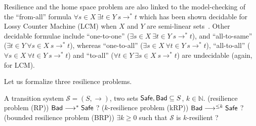 Resilience and the home space problem are also linked to the 
model-checking of the ``from-all'' formula $\forall s \in X~ \exists t \in Y~ s \to^* t$
which has been shown decidable for Lossy Counter Machine (LCM)
when $X$ and $Y$ are semi-linear sets~\cite{DBLP:conf/rp/Schnoebelen10}.
Other decidable formulae include ``one-to-one'' ($\exists s \in  X ~ \exists t \in  Y ~ s \to^* 
 t$), and ``all-to-same'' ($\exists t \in  Y ~ \forall s \in  X ~ s \to^*  t$),
whereas ``one-to-all'' ($\exists s \in  X ~ \forall t \in  Y ~ s \to^*  t$), 
``all-to-all'' ($\forall s \in  X ~ \forall t \in  Y ~ s \to^*  t$)
  and ``to-all'' ($\forall t \in  Y  ~ \exists s \in  X ~ s \to^*  t$) are undecidable (again, for LCM). 
  


Let us formalize three resilience problems.

\iffalse
\problemx{resilience problem (RP)}
{A transition system $\mathscr{S}=(S,\rightarrow)$ and two sets $\Safe, \Bad \subseteq S$.}
{$\Bad \longrightarrow^{*} \Safe$ ?\newline}

\alain{il faudrait ne pas répéter 3 fois les mêmes imputs pour les 3 pbs: énoncer les 3 uniformes pbs d'un coup avec une fois l'input puis les 3 pbs pour un état s donné sans répéter non plus 3 fois les mêmes inputs}


\problemx{$k$-resilience problem (kRP)}
{A transition system $\mathscr{S}=(S,\rightarrow), k \in \mathbb{N}$ and two sets $\Safe, \Bad \subseteq S$.}
{$\Bad \longrightarrow^{\leq k} \Safe$ ?\newline}

\problemx{bounded resilience problem (BRP)}
{A transition system $\mathscr{S}=(S,\rightarrow)$ and two sets $\Safe, \Bad \subseteq S$.}
{$\exists k \geq 0$ such that $\mathscr{S}$ is %
 $k$-resilient ?\newline}

\fi


{A transition system $\mathscr{S}=(S,\rightarrow)$, two sets $\Safe, \Bad \subseteq S$, $k \in \mathbb{N}$.}
{ ({\sc resilience problem (RP)}) $\Bad \longrightarrow^{*} \Safe$ ?\newline  
({\sc $k$-resilience problem (kRP)})		$\Bad \longrightarrow^{\leq k} \Safe$ ?\newline
({\sc bounded resilience problem (BRP)})	$\exists k \geq 0$ such that $\mathscr{S}$ is 
 $k$-resilient ?\newline}


